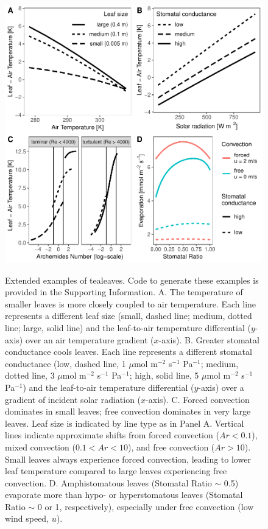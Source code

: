 \documentclass[11pt, oneside]{article}
\newcommand{\pkg}[1]{{\fontseries{b}\selectfont #1}}
\newcommand{\tealeaves}{\pkg{tealeaves}}
\begin{document}



\clearpage


\begin{figure}[ht]
\centerline{\includegraphics[width=\textwidth,height=\textwidth]{../figures/fig1.pdf}}
\end{figure}

\begin{figure}[t!]
\caption{Extended examples of \tealeaves. Code to generate these examples is provided in the Supporting Information. A. The temperature of smaller leaves is more closely coupled to air temperature. Each line represents a different leaf size (small, dashed line; medium, dotted line; large, solid line) and the leaf-to-air temperature differential ($y$-axis) over an air temperature gradient ($x$-axis). B. Greater stomatal conductance cools leaves. Each line represents a different stomatal conductance (low, dashed line, 1 $\mu$mol m$^{-2}$ s$^{-1}$ Pa$^{-1}$; medium, dotted line, 3 $\mu$mol m$^{-2}$ s$^{-1}$ Pa$^{-1}$; high, solid line, 5 $\mu$mol m$^{-2}$ s$^{-1}$ Pa$^{-1}$) and the leaf-to-air temperature differential ($y$-axis) over a gradient of incident solar radiation ($x$-axis). C. Forced convection dominates in small leaves; free convection dominates in very large leaves. Leaf size is indicated by line type as in Panel A. Vertical lines indicate approximate shifts from forced convection ($\mathit{Ar} < 0.1$), mixed convection ($0.1 < \mathit{Ar} < 10$), and free convection ($\mathit{Ar} > 10$). Small leaves always experience forced convection, leading to lower leaf temperature compared to large leaves experiencing free convection. D. Amphistomatous leaves (Stomatal Ratio $\sim$ 0.5) evaporate more than hypo- or hyperstomatous leaves (Stomatal Ratio $\sim$ 0 or 1, respectively), especially under free convection (low wind speed, $u$).}
\label{fig:fig1}
\end{figure}
\end{document}
